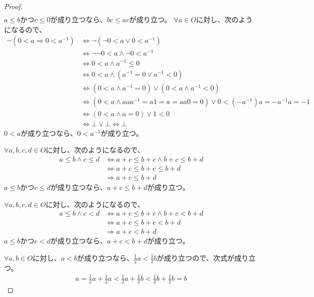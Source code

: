 \documentclass[dvipdfmx]{jsarticle}
\begin{document}
\begin{proof}
\begin{align*}
\end{align*}
$a \leq b$かつ$c \leq 0$が成り立つなら、$bc \leq ac$が成り立つ。
$\forall a \in O$に対し、次のようになるので、
\begin{align*}
\neg\left( 0 < a \Rightarrow 0 < a^{- 1} \right) &\Leftrightarrow \neg\left( \neg 0 < a \vee 0 < a^{- 1} \right)\\ 
&\Leftrightarrow \neg\neg 0 < a \land \neg 0 < a^{- 1}\\ 
&\Leftrightarrow 0 < a \land a^{- 1} \leq 0\\ 
&\Leftrightarrow 0 < a \land \left( a^{- 1} = 0 \vee a^{- 1} < 0 \right)\\ 
&\Leftrightarrow \left( 0 < a \land a^{- 1} = 0 \right) \vee \left( 0 < a \land a^{- 1} < 0 \right)\\ 
&\Leftrightarrow \left( 0 < a \land aaa^{- 1} = a1 = a = aa0 = 0 \right) \vee 0 < \left( - a^{- 1} \right)a = - a^{- 1}a = - 1\\ 
&\Leftrightarrow (0 < a \land a = 0) \vee 1 < 0\\ 
&\Leftrightarrow \bot \vee \bot \Leftrightarrow \bot
\end{align*}
$0 < a$が成り立つなら、$0 < a^{- 1}$が成り立つ。\par
$\forall a,b,c,d \in O$に対し、次のようになるので、
\begin{align*}
a \leq b \land c \leq d &\Leftrightarrow a + c \leq b + c \land b + c \leq b + d\\ 
&\Leftrightarrow a + c \leq b + c \leq b + d\\ 
&\Rightarrow a + c \leq b + d
\end{align*}
$a \leq b$かつ$c \leq d$が成り立つなら、$a + c \leq b + d$が成り立つ。\par
$\forall a,b,c,d \in O$に対し、次のようになるので、
\begin{align*}
a \leq b \land c < d &\Leftrightarrow a + c \leq b + c \land b + c < b + d\\ 
&\Leftrightarrow a + c \leq b + c < b + d\\ 
&\Rightarrow a + c < b + d
\end{align*}
$a \leq b$かつ$c < d$が成り立つなら、$a + c < b + d$が成り立つ。\par
$\forall a,b \in O$に対し、$a < b$が成り立つなら、$\frac{1}{2}a < \frac{1}{2}b$が成り立つので、次式が成り立つ。
\begin{align*}
a = \frac{1}{2}a + \frac{1}{2}a < \frac{1}{2}a + \frac{1}{2}b < \frac{1}{2}b + \frac{1}{2}b = b
\end{align*}

\end{proof}
\end{document}
